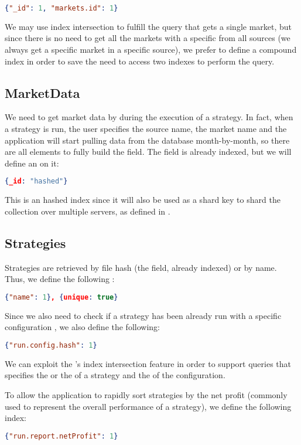 \begin{lstlisting}[language=json]
{"_id": 1, "markets.id": 1}
\end{lstlisting}

We may use index intersection to fulfill the query that gets a single market,
but since there is no need to get all the markets with a specific  from
all sources (we always get a specific market in a specific source), we prefer to
define a compound index in order to save \mongodb{} the need to access two
indexes to perform the query.

\subsection{MarketData}

We need to get market data by  during the execution of a strategy. In
fact, when a strategy is run, the user specifies the source name, the market
name and the application will start pulling data from the database
month-by-month, so there are all elements to fully build the  field.
The  field is already indexed, but we will define an  on it:

\begin{lstlisting}[language=json]
{_id: "hashed"}
\end{lstlisting}

This is an hashed index since it will also be used as a shard key to shard the
collection over multiple servers, as defined in .

\subsection{Strategies}

Strategies are retrieved by file hash (the  field, already indexed)
or by name. Thus, we define the following :

\begin{lstlisting}[language=json]
{"name": 1}, {unique: true}
\end{lstlisting}

Since we also need to check if a strategy has been already run with a specific
configuration , we also define the
following:

\begin{lstlisting}[language=json]
{"run.config.hash": 1}
\end{lstlisting}

We can exploit the \mongodb's index intersection feature in order to support
queries that specifies the  or the  of a strategy and the
 of the configuration.

To allow the application to rapidly sort strategies by the net profit (commonly
used to represent the overall performance of a strategy), we define the
following index:

\begin{lstlisting}[language=json]
{"run.report.netProfit": 1}
\end{lstlisting}
